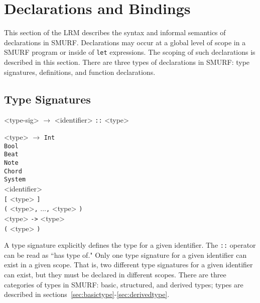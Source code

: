 \section{Declarations and Bindings}
\label{sec:declarations}
\setlength{\grammarindent}{4em}

This section of the LRM describes the syntax and informal semantics of
declarations in SMURF. Declarations may occur at a global level of scope
in a SMURF program or inside of
\texttt{let} expressions. The scoping of such declarations is described 
in this section. There are three types of declarations in SMURF: 
type signatures, definitions, and function declarations.

\subsection{Type Signatures}

\begin{grammar}

<type-sig> $\rightarrow$ <identifier> \texttt{::} <type>

<type> $\rightarrow$ \texttt{Int} \\ \texttt{Bool} \\ \texttt{Beat} \\ \texttt{Note} \\
											\texttt{Chord} \\ \texttt{System} \\ <identifier> \\ 
											\texttt{[} <type> \texttt{]} \\ \texttt{(} <type>\texttt{,} 
											$\ldots$\texttt{,} <type> \texttt{)} \\ <type> \texttt{->} <type>
											 \\ \texttt{(} <type> \texttt{)}
										

\end{grammar}

A type signature explicitly defines the type for a given identifier. The
\texttt{::} operator can be read as ``has type of." Only one type signature
for a given identifier can exist in a given scope. That is, two different
type signatures for a given identifier can exist, but they must be declared
in different scopes. There are three categories of types in SMURF: basic,  structured, and derived types; types are described in sections~\ref{sec:basictype}-\ref{sec:derivedtype}.


